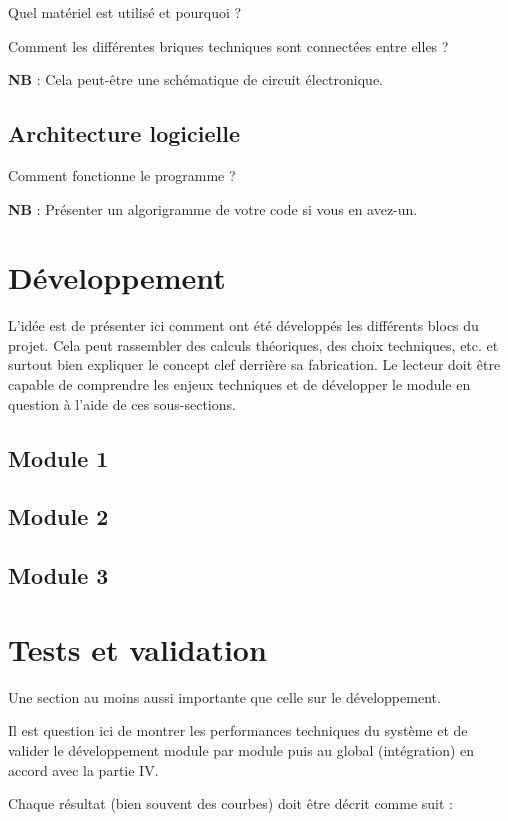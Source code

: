 \documentclass[a4paper,11pt]{article}
\begin{document}
Quel matériel est utilisé et pourquoi ?
			
Comment les différentes briques techniques sont connectées entre elles ?
			
\textbf{NB} : Cela peut-être une schématique de circuit électronique.
			
\subsection{Architecture logicielle}
		
Comment fonctionne le programme ?
			
\textbf{NB} : Présenter un algorigramme de votre code si vous en avez-un.
	
\section{Développement}
			
L’idée est de présenter ici comment ont été développés les différents blocs du projet. Cela peut rassembler des calculs théoriques, des choix techniques, etc. et surtout bien expliquer le concept clef derrière	sa fabrication. Le lecteur doit être capable de comprendre les enjeux techniques et de développer le module en question à l’aide de ces sous-sections.
			
\subsection{Module 1}
\subsection{Module 2}
\subsection{Module 3}
		
\section{Tests et validation}
	
Une section au moins aussi importante que celle sur le développement.
		
Il est question ici de montrer les performances techniques du système et de valider le développement module par module puis au global (intégration) en accord avec la partie IV.
		
Chaque résultat (bien souvent des courbes) doit être décrit comme suit :
		
\end{document}
